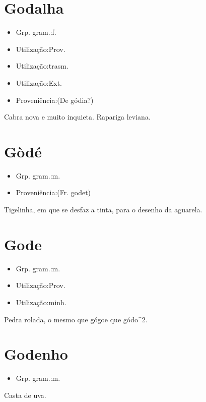 \section{Godalha}
\begin{itemize}
\item {Grp. gram.:f.}
\end{itemize}
\begin{itemize}
\item {Utilização:Prov.}
\end{itemize}
\begin{itemize}
\item {Utilização:trasm.}
\end{itemize}
\begin{itemize}
\item {Utilização:Ext.}
\end{itemize}
\begin{itemize}
\item {Proveniência:(De \textunderscore gódia\textunderscore ?)}
\end{itemize}
Cabra nova e muito inquieta.
Rapariga leviana.
\section{Gòdé}
\begin{itemize}
\item {Grp. gram.:m.}
\end{itemize}
\begin{itemize}
\item {Proveniência:(Fr. \textunderscore godet\textunderscore )}
\end{itemize}
Tigelinha, em que se desfaz a tinta, para o desenho da aguarela.
\section{Gode}
\begin{itemize}
\item {Grp. gram.:m.}
\end{itemize}
\begin{itemize}
\item {Utilização:Prov.}
\end{itemize}
\begin{itemize}
\item {Utilização:minh.}
\end{itemize}
Pedra rolada, o mesmo que \textunderscore gógo\textunderscore  e que \textunderscore gódo\textunderscore ^2.
\section{Godenho}
\begin{itemize}
\item {Grp. gram.:m.}
\end{itemize}
Casta de uva.
